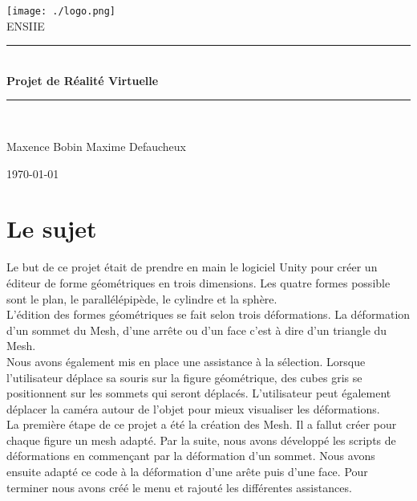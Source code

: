 \documentclass[a4paper,oneside,12pt,titlepage]{article}
\newcommand{\HRule}{\rule{\linewidth}{0.5mm}}
\begin{document}
\begin{titlepage}
\begin{center}
 
\texttt{[image: ./logo.png]}\\[1cm]
 
\textsc{\Large ENSIIE}\\[0.5cm]
 
 
\HRule \\[0.4cm]
{ \huge \bfseries
Projet de Réalité Virtuelle}\\[0.4cm]
 
\HRule \\[1.5cm]
 
\begin{center}
\large Maxence Bobin
\large Maxime Defaucheux
\end{center}
 
\vfill
{\large \today}
 
\end{center}
\end{titlepage}

\clearpage
\tableofcontents
\clearpage

\section{Le sujet}

Le but de ce projet était de prendre en main le logiciel Unity pour créer un éditeur de forme géométriques en trois dimensions. Les quatre formes possible sont le plan, le parallélépipède, le cylindre et la sphère.\\
L'édition des formes géométriques se fait selon trois déformations. La déformation d'un sommet du Mesh, d'une arrête ou d'un face c'est à dire d'un triangle du Mesh.
\\Nous avons également mis en place une assistance à la sélection. Lorsque l'utilisateur déplace sa souris sur la figure géométrique, des cubes gris se positionnent sur les sommets qui seront déplacés. L'utilisateur peut également déplacer la caméra autour de l'objet pour mieux visualiser les déformations.\\

La première étape de ce projet a été la création des Mesh. Il a fallut créer pour chaque figure un mesh adapté.
Par la suite, nous avons développé les scripts de déformations en commençant par la déformation d'un sommet. Nous avons ensuite adapté ce code à la déformation d'une arête puis d'une face. Pour terminer nous avons créé le menu et rajouté les différentes assistances.
\end{document}
